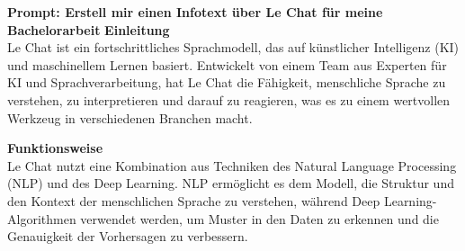 \begin{prompt}
    \begin{tcolorbox}[colback=gray!20, colframe=gray!20, boxrule=0pt, sharp corners] 
        \textbf{Prompt: Erstell mir einen Infotext über Le Chat für meine Bachelorarbeit}
        \textbf{Einleitung}\\
        Le Chat ist ein fortschrittliches Sprachmodell, das auf künstlicher Intelligenz (KI) und maschinellem Lernen 
        basiert. Entwickelt von einem Team aus Experten für KI und Sprachverarbeitung, hat Le Chat die Fähigkeit, 
        menschliche Sprache zu verstehen, zu interpretieren und darauf zu reagieren, was es zu einem wertvollen 
        Werkzeug in verschiedenen Branchen macht.

        \textbf{Funktionsweise}\\
        Le Chat nutzt eine Kombination aus Techniken des Natural Language Processing (NLP) und des Deep Learning. NLP 
        ermöglicht es dem Modell, die Struktur und den Kontext der menschlichen Sprache zu verstehen, während Deep 
        Learning-Algorithmen verwendet werden, um Muster in den Daten zu erkennen und die Genauigkeit der Vorhersagen 
        zu verbessern.


\end{tcolorbox}
\end{prompt}
